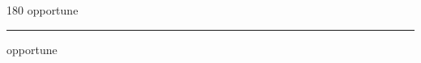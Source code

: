 
\begin{frame}
\begin{center}
\begin{turn}{180}
{\fontsize{2.5cm}{1em}\selectfont opportune}
\end{turn}
\vspace{1em}\par  
\hrule
\vspace{1em}\par  
{\fontsize{2.5cm}{1em}\selectfont opportune}
\end{center}
\end{frame}
